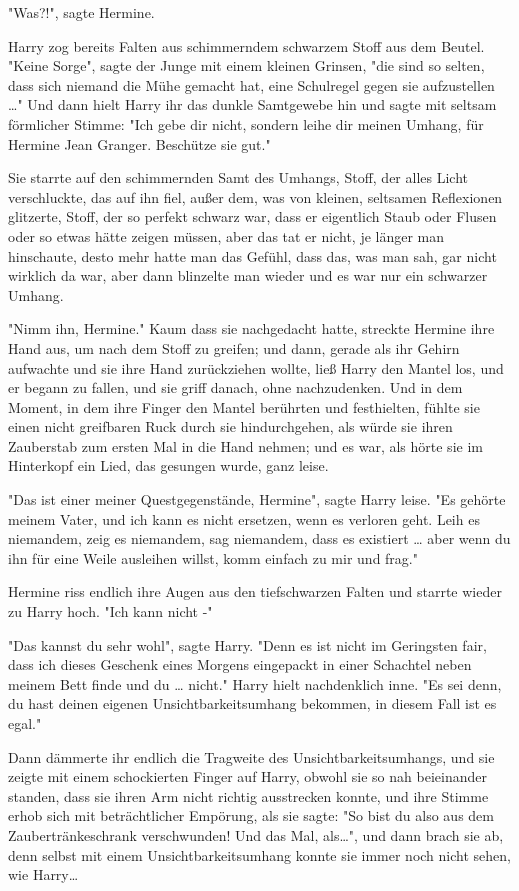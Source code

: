 {"Was?!", sagte Hermine.

Harry zog bereits Falten aus schimmerndem schwarzem Stoff aus dem Beutel.\\ "Keine Sorge", sagte der Junge mit einem kleinen Grinsen, "die sind so selten, dass sich niemand die Mühe gemacht hat, eine Schulregel gegen sie aufzustellen …" Und dann hielt Harry ihr das dunkle Samtgewebe hin und sagte mit seltsam förmlicher Stimme: "Ich gebe dir nicht, sondern leihe dir meinen Umhang, für Hermine Jean Granger. Beschütze sie gut."

Sie starrte auf den schimmernden Samt des Umhangs, Stoff, der alles Licht verschluckte, das auf ihn fiel, außer dem, was von kleinen, seltsamen Reflexionen glitzerte, Stoff, der so perfekt schwarz war, dass er eigentlich Staub oder Flusen oder so etwas hätte zeigen müssen, aber das tat er nicht, je länger man hinschaute, desto mehr hatte man das Gefühl, dass das, was man sah, gar nicht wirklich da war, aber dann blinzelte man wieder und es war nur ein schwarzer Umhang.

"Nimm ihn, Hermine." Kaum dass sie nachgedacht hatte, streckte Hermine ihre Hand aus, um nach dem Stoff zu greifen; und dann, gerade als ihr Gehirn aufwachte und sie ihre Hand zurückziehen wollte, ließ Harry den Mantel los, und er begann zu fallen, und sie griff danach, ohne nachzudenken. Und in dem Moment, in dem ihre Finger den Mantel berührten und festhielten, fühlte sie einen nicht greifbaren Ruck durch sie hindurchgehen, als würde sie ihren Zauberstab zum ersten Mal in die Hand nehmen; und es war, als hörte sie im Hinterkopf ein Lied, das gesungen wurde, ganz leise.

"Das ist einer meiner Questgegenstände, Hermine", sagte Harry leise. "Es gehörte meinem Vater, und ich kann es nicht ersetzen, wenn es verloren geht. Leih es niemandem, zeig es niemandem, sag niemandem, dass es existiert … aber wenn du ihn für eine Weile ausleihen willst, komm einfach zu mir und frag."

Hermine riss endlich ihre Augen aus den tiefschwarzen Falten und starrte wieder zu Harry hoch. "Ich kann nicht -"

"Das kannst du sehr wohl", sagte Harry. "Denn es ist nicht im Geringsten fair, dass ich dieses Geschenk eines Morgens eingepackt in einer Schachtel neben meinem Bett finde und du … nicht." Harry hielt nachdenklich inne. "Es sei denn, du hast deinen eigenen Unsichtbarkeitsumhang bekommen, in diesem Fall ist es egal."

Dann dämmerte ihr endlich die Tragweite des Unsichtbarkeitsumhangs, und sie zeigte mit einem schockierten Finger auf Harry, obwohl sie so nah beieinander standen, dass sie ihren Arm nicht richtig ausstrecken konnte, und ihre Stimme erhob sich mit beträchtlicher Empörung, als sie sagte: "So bist du also aus dem Zaubertränkeschrank verschwunden! Und das Mal, als…", und dann brach sie ab, denn selbst mit einem Unsichtbarkeitsumhang konnte sie immer noch nicht sehen, wie Harry…

}
